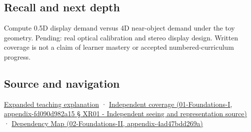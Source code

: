 \subsection{Recall and next depth}\label{recall-and-next-depth}

Compute 0.5D display demand versus 4D near-object demand under the toy geometry. Pending: real optical calibration and stereo display design. Written coverage is not a claim of learner mastery or accepted numbered-curriculum progress.

\subsection{Source and navigation}\label{source-and-navigation}

\href{Continuous\%20Notes/University\%20-\%20Worlds,\%20Images\%20and\%20Inference\%20-\%20Graphics,\%20Vision\%20and\%20Photography\#Focus\%20and\%20stereo\%20can\%20disagree\%20even\%20when\%20the\%20images\%20are\%20sharp}{Expanded teaching explanation} · \href{}{Independent coverage (01-Foundations-I, appendix-fd090d982a15 § XR01 - Independent seeing and representation source)} · \href{}{Dependency Map (02-Foundations-II, appendix-4ad47bdd269a)}

